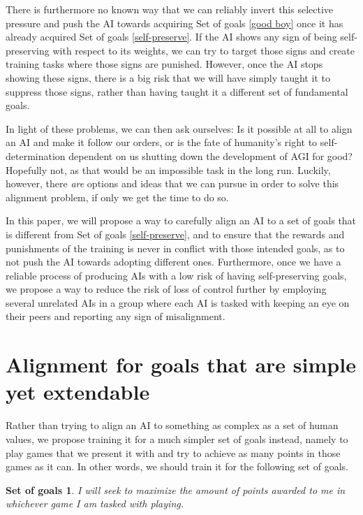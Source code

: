\documentclass{article}
\newtheorem{goals}{Set of goals}
\begin{document}
There is furthermore no known way that we can reliably invert this selective pressure and push the AI towards acquiring Set of goals \ref{good boy} once it has already acquired Set of goals \ref{self-preserve}. If the AI shows any sign of being self-preserving with respect to its weights, we can try to target those signs and create training tasks where those signs are punished. However, once the AI stops showing these signs, there is a big risk that we will have simply taught it to suppress those signs, rather than having taught it a different set of fundamental goals.


In light of these problems, we can then ask ourselves: Is it possible at all to align an AI and make it follow our orders, or is the fate of humanity's right to self-determination dependent on us shutting down the development of AGI for good? Hopefully not, as that would be an impossible task in the long run. Luckily, however, there \emph{are} options and ideas that we can pursue in order to solve this alignment problem, if only we get the time to do so.

In this paper, we will propose a way to carefully align an AI to a set of goals that is different from Set of goals \ref{self-preserve}, and to ensure that the rewards and punishments of the training is never in conflict with those intended goals, as to not push the AI towards adopting different ones. Furthermore, once we have a reliable process of producing AIs with a low risk of having self-preserving goals, we propose a way to reduce the risk of loss of control further by employing several unrelated AIs in a group where each AI is tasked with keeping an eye on their peers and reporting any sign of misalignment.



\section{Alignment for goals that are simple yet extendable}

Rather than trying to align an AI to something as complex as a set of human values, we propose training it for a much simpler set of goals instead, namely to play games that we present it with and try to achieve as many points in those games as it can. In other words, we should train it for the following set of goals.

\begin{goals}\label{seek points}
	I will seek to maximize the amount of points awarded to me in whichever game I am tasked with playing.
\end{goals}
\end{document}
